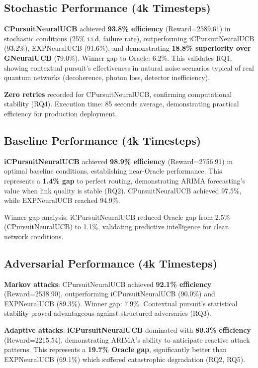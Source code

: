 \documentclass[sigconf,anonymous,review,natbib=false]{acmart}
\begin{document}
\subsection{Stochastic Performance (4k Timesteps)}

\textbf{CPursuitNeuralUCB} achieved \textbf{93.8\% efficiency} (Reward=2589.61) in stochastic conditions (25\% i.i.d. failure rate), outperforming iCPursuitNeuralUCB (93.2\%), EXPNeuralUCB (91.6\%), and demonstrating \textbf{18.8\% superiority over GNeuralUCB} (79.0\%). Winner gap to Oracle: 6.2\%. This validates RQ1, showing contextual pursuit's effectiveness in natural noise scenarios typical of real quantum networks (decoherence, photon loss, detector inefficiency).

\textbf{Zero retries} recorded for CPursuitNeuralUCB, confirming computational stability (RQ4). Execution time: 85 seconds average, demonstrating practical efficiency for production deployment.

\subsection{Baseline Performance (4k Timesteps)}

\textbf{iCPursuitNeuralUCB} achieved \textbf{98.9\% efficiency} (Reward=2756.91) in optimal baseline conditions, establishing near-Oracle performance. This represents a \textbf{1.4\% gap} to perfect routing, demonstrating ARIMA forecasting's value when link quality is stable (RQ2). CPursuitNeuralUCB achieved 97.5\%, while EXPNeuralUCB reached 94.9\%.

Winner gap analysis: iCPursuitNeuralUCB reduced Oracle gap from 2.5\% (CPursuitNeuralUCB) to 1.1\%, validating predictive intelligence for clean network conditions.

\subsection{Adversarial Performance (4k Timesteps)}

\textbf{Markov attacks}: CPursuitNeuralUCB achieved \textbf{92.1\% efficiency} (Reward=2538.90), outperforming iCPursuitNeuralUCB (90.0\%) and EXPNeuralUCB (89.3\%). Winner gap: 7.9\%. Contextual pursuit's statistical stability proved advantageous against structured adversaries (RQ3).

\textbf{Adaptive attacks}: \textbf{iCPursuitNeuralUCB} dominated with \textbf{80.3\% efficiency} (Reward=2215.54), demonstrating ARIMA's ability to anticipate reactive attack patterns. This represents a \textbf{19.7\% Oracle gap}, significantly better than EXPNeuralUCB (69.1\%) which suffered catastrophic degradation (RQ2, RQ5).
\end{document}
